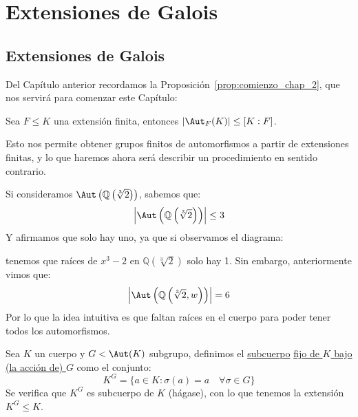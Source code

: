\chapter{Extensiones de Galois}
\section{Extensiones de Galois}
\noindent
Del Capítulo anterior recordamos la Proposición~\ref{prop:comienzo_chap_2}, que nos servirá para comenzar este Capítulo:

\begin{center}
    Sea $F\leq K$ una extensión finita, entonces $|\Aut_F(K)| \leq [K:F]$.
\end{center}

\noindent
Esto nos permite obtener grupos finitos de automorfismos a partir de extensiones finitas, y lo que haremos ahora será describir un procedimiento en sentido contrario.

\begin{ejemplo}
    Si consideramos $\Aut\left(\mathbb{Q}\left(\sqrt[3]{2}\right)\right)$, sabemos que:
    \begin{equation*}
        \left|\Aut\left(\mathbb{Q}\left(\sqrt[3]{2}\right)\right)\right| \leq 3
    \end{equation*}
    Y afirmamos que solo hay uno, ya que si observamos el diagrama:
    \begin{figure}[H]
        \centering
    \end{figure}
    \noindent
    tenemos que raíces de $x^3-2$ en $\mathbb{Q}\left(\sqrt[3]{2}\right)$ solo hay 1. Sin embargo, anteriormente vimos que:
    \begin{equation*}
        \left|\Aut\left(\mathbb{Q}\left(\sqrt[3]{2},w\right)\right)\right| = 6
    \end{equation*}
    Por lo que la idea intuitiva es que faltan raíces en el cuerpo para poder tener todos los automorfismos.
\end{ejemplo}

\begin{definicion}
    Sea $K$ un cuerpo y $G< \Aut(K)$ subgrupo, definimos el \underline{subcuerpo} \underline{fijo de $K$ bajo (la acción de) $G$} como el conjunto:
    \begin{equation*}
        K^G = \{a\in K : \sigma(a) = a \quad \forall \sigma\in G\}
    \end{equation*}
    Se verifica que $K^G$ es subcuerpo de $K$ (hágase), con lo que tenemos la extensión $K^G\leq K$.
\end{definicion}

